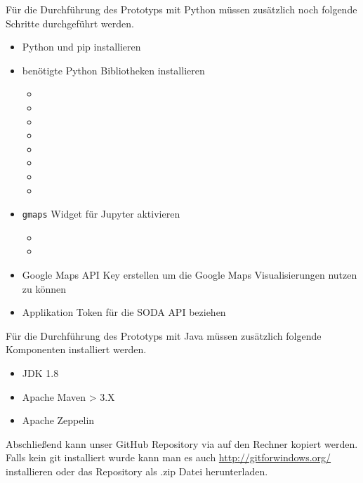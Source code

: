 Für die Durchführung des Prototyps mit Python müssen zusätzlich noch folgende Schritte durchgeführt werden.
\begin{itemize}
  \item Python und pip installieren\autocite{Python}
  \item benötigte Python Bibliotheken installieren
  \begin{itemize}
    \item {}
    \item {}
    \item {}
    \item {}
    \item {}
    \item {}
    \item {}
    \item {}
  \end{itemize}
  \item \texttt{gmaps} Widget für Jupyter aktivieren
  \begin{itemize}
    \item {}
    \item {}
  \end{itemize}
  \item Google Maps API Key erstellen um die Google Maps Visualisierungen nutzen zu können
  \item Applikation Token für die \ac{SODA} \ac{API} beziehen\autocite{AppToken}
\end{itemize}

Für die Durchführung des Prototyps mit Java müssen zusätzlich folgende Komponenten installiert werden.
\begin{itemize}
  \item JDK 1.8
  \item Apache Maven > 3.X
  \item Apache Zeppelin
\end{itemize}

Abschließend kann unser GitHub Repository via 
auf den Rechner kopiert werden.
Falls kein git installiert wurde kann man es auch \hyperref[hier]{http://gitforwindows.org/} installieren oder das Repository als .zip Datei herunterladen.

